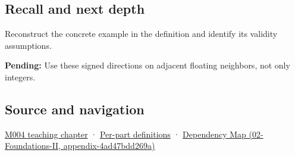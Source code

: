 \subsection{Recall and next depth}\label{appendix-637d164ae5ca-recall-and-next-depth}

Reconstruct the concrete example in the definition and identify its validity assumptions.

\textbf{Pending:} Use these signed directions on adjacent floating neighbors, not only integers.

\subsection{Source and navigation}\label{appendix-637d164ae5ca-source-and-navigation}

\hyperref[01-foundations-i-ch001-a-stretching-ruler-for-real-valued-quantities]{M004 teaching chapter} · \hyperref[appendix-fd090d982a15-m004---parts-61-76]{Per-part definitions} · \href{../02-Foundations-II/main.pdf\#nameddest=appendix-4ad47bdd269a}{Dependency Map (02-Foundations-II, appendix-4ad47bdd269a)}
